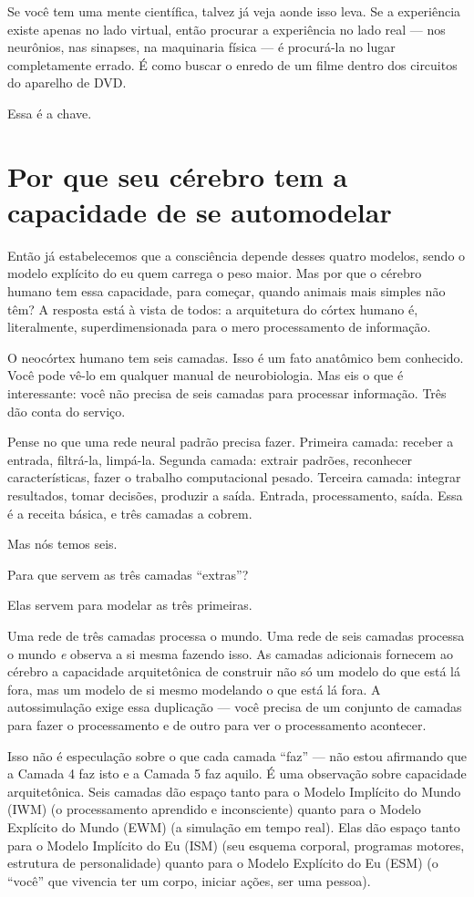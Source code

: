 \documentclass[11pt, twoside, openright]{book}
\begin{document}
Se você tem uma mente científica, talvez já veja aonde isso leva. Se a experiência existe apenas no lado virtual, então procurar a experiência no lado real --- nos neurônios, nas sinapses, na maquinaria física --- é procurá-la no lugar completamente errado. É como buscar o enredo de um filme dentro dos circuitos do aparelho de DVD.

Essa é a chave.

\section*{Por que seu cérebro tem a capacidade de se automodelar}

Então já estabelecemos que a consciência depende desses quatro modelos, sendo o modelo explícito do eu quem carrega o peso maior. Mas por que o cérebro humano tem essa capacidade, para começar, quando animais mais simples não têm? A resposta está à vista de todos: a arquitetura do córtex humano é, literalmente, superdimensionada para o mero processamento de informação.

O neocórtex humano tem seis camadas. Isso é um fato anatômico bem conhecido. Você pode vê-lo em qualquer manual de neurobiologia. Mas eis o que é interessante: você não precisa de seis camadas para processar informação. Três dão conta do serviço.

Pense no que uma rede neural padrão precisa fazer. Primeira camada: receber a entrada, filtrá-la, limpá-la. Segunda camada: extrair padrões, reconhecer características, fazer o trabalho computacional pesado. Terceira camada: integrar resultados, tomar decisões, produzir a saída. Entrada, processamento, saída. Essa é a receita básica, e três camadas a cobrem.

Mas nós temos seis.

Para que servem as três camadas ``extras''?

Elas servem para modelar as três primeiras.

Uma rede de três camadas processa o mundo. Uma rede de seis camadas processa o mundo \textit{e} observa a si mesma fazendo isso. As camadas adicionais fornecem ao cérebro a capacidade arquitetônica de construir não só um modelo do que está lá fora, mas um modelo de si mesmo modelando o que está lá fora. A autossimulação exige essa duplicação --- você precisa de um conjunto de camadas para fazer o processamento e de outro para ver o processamento acontecer.

Isso não é especulação sobre o que cada camada ``faz'' --- não estou afirmando que a Camada 4 faz isto e a Camada 5 faz aquilo. É uma observação sobre capacidade arquitetônica. Seis camadas dão espaço tanto para o Modelo Implícito do Mundo (IWM) (o processamento aprendido e inconsciente) quanto para o Modelo Explícito do Mundo (EWM) (a simulação em tempo real). Elas dão espaço tanto para o Modelo Implícito do Eu (ISM) (seu esquema corporal, programas motores, estrutura de personalidade) quanto para o Modelo Explícito do Eu (ESM) (o ``você'' que vivencia ter um corpo, iniciar ações, ser uma pessoa).
\end{document}
